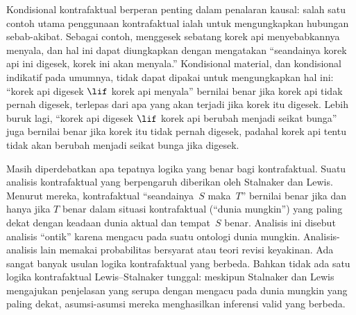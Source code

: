 \documentclass[../../../include/open-logic-section]{subfiles}
\begin{document}
Kondisional kontrafaktual berperan penting dalam penalaran kausal: salah satu
contoh utama penggunaan kontrafaktual ialah untuk mengungkapkan hubungan
sebab-akibat. Sebagai contoh, menggesek sebatang korek api menyebabkannya
menyala, dan hal ini dapat diungkapkan dengan mengatakan ``seandainya korek
api ini digesek, korek ini akan menyala.'' Kondisional material, dan
kondisional indikatif pada umumnya, tidak dapat dipakai untuk mengungkapkan
hal ini: ``korek api digesek $\lif$ korek api menyala'' bernilai benar jika
korek api tidak pernah digesek, terlepas dari apa yang akan terjadi jika
korek itu digesek. Lebih buruk lagi, ``korek api digesek $\lif$ korek api
berubah menjadi seikat bunga'' juga bernilai benar jika korek itu tidak pernah
digesek, padahal korek api tentu tidak akan berubah menjadi seikat bunga jika
digesek.

Masih diperdebatkan apa tepatnya logika yang benar bagi kontrafaktual. Suatu
analisis kontrafaktual yang berpengaruh diberikan oleh Stalnaker dan Lewis.
Menurut mereka, kontrafaktual ``seandainya~$S$ maka~$T$'' bernilai benar jika
dan hanya jika $T$ benar dalam situasi kontrafaktual (``dunia mungkin'') yang
paling dekat dengan keadaan dunia aktual dan tempat~$S$ benar. Analisis ini
disebut analisis ``ontik'' karena mengacu pada suatu ontologi dunia mungkin.
Analisis-analisis lain memakai probabilitas bersyarat atau teori revisi
keyakinan. Ada sangat banyak usulan logika kontrafaktual yang berbeda. Bahkan
tidak ada satu logika kontrafaktual Lewis--Stalnaker tunggal: meskipun
Stalnaker dan Lewis mengajukan penjelasan yang serupa dengan mengacu pada dunia
mungkin yang paling dekat, asumsi-asumsi mereka menghasilkan inferensi valid
yang berbeda.
\end{document}
